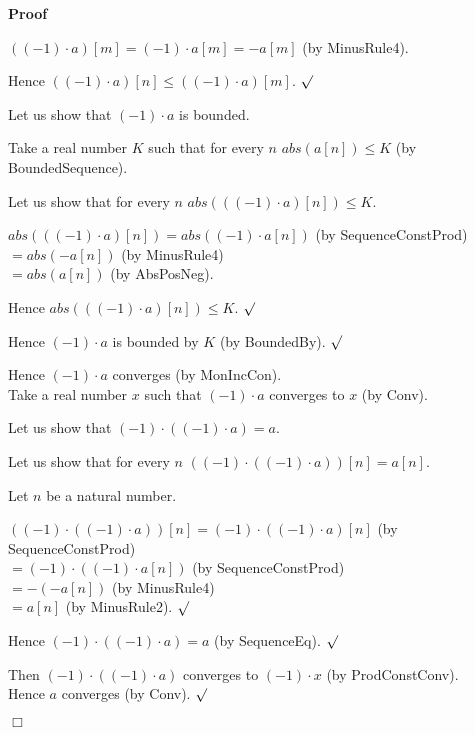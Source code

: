 \documentclass{article}
\newenvironment{forthel}{\begin{leftbar}}{\end{leftbar}}
\newenvironment{proof}{\noindent\textbf{Proof\ }}{\hspace*{\fill}$\Box$\medskip}
\newenvironment{subproof}{\begin{list}{}{}
		\item[\text{Proof}]}{\hfill $\surd$ \end{list}}
\newcommand{\cdottwo}{\cdot}
\newcommand{\dotequal}{=}
\begin{document}
\begin{forthel}
\begin{proof}
\begin{subproof}
\begin{subproof}
				$((-1) \cdottwo a)[m] \dotequal (-1) \cdot a[m]
				\dotequal -a[m]$ (by MinusRule4).
				
				Hence $((-1) \cdottwo a)[n] \leq ((-1) \cdottwo a)[m]$.
			\end{subproof}
		
			Let us show that $(-1) \cdottwo a$ is bounded.
			\begin{subproof}
				Take a real number $K$ such that for every $n$ $abs(a[n]) \leq K$ (by BoundedSequence).
				
				Let us show that for every $n$ $abs(((-1) \cdottwo a)[n]) \leq K$.
				\begin{subproof}
					$abs(((-1) \cdottwo a)[n]) \dotequal abs((-1) \cdot a[n])$ (by SequenceConstProd)\\
					$\dotequal abs(-a[n])$ (by MinusRule4)\\
					$\dotequal abs(a[n])$ (by AbsPosNeg).
					
					Hence $abs(((-1) \cdottwo a)[n]) \leq K$.
				\end{subproof}
				Hence $(-1) \cdottwo a$ is bounded by $K$ (by BoundedBy).
			\end{subproof}
			Hence $(-1) \cdottwo a$ converges (by MonIncCon).\\
			Take a real number $x$ such that $(-1) \cdottwo a$ converges to $x$ (by Conv).
			
			Let us show that $(-1) \cdottwo ((-1) \cdottwo a) = a$.
			\begin{subproof}
				Let us show that for every $n$ $((-1) \cdottwo ((-1) \cdottwo a))[n] = a[n]$.
				\begin{subproof}
					Let $n$ be a natural number.
					
					$((-1) \cdottwo ((-1) \cdottwo a))[n] \dotequal (-1) \cdot ((-1) \cdottwo a)[n]$ (by SequenceConstProd)\\
					$\dotequal (-1) \cdot ((-1) \cdot a[n])$ (by SequenceConstProd)\\
					$\dotequal -(-a[n])$ (by MinusRule4)\\
					$\dotequal a[n]$ (by MinusRule2).
				\end{subproof}
				
				Hence $(-1) \cdottwo ((-1) \cdottwo a) = a$ (by SequenceEq).
			\end{subproof}
			
			Then $(-1) \cdottwo ((-1) \cdottwo a)$ converges to $(-1) \cdot x$ (by ProdConstConv).\\
			Hence $a$ converges (by Conv).
		\end{subproof}
	\end{proof}
\end{forthel}
\end{document}
